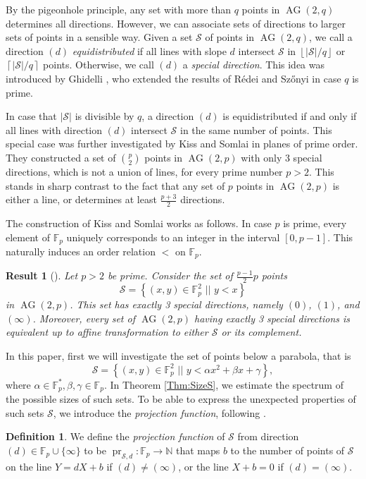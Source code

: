 \documentclass[a4paper, 12pt]{article}
\newtheorem{res}[thm]{Result}
\theoremstyle{definition}
\newtheorem{df}[thm]{Definition}
\newcommand{\FF}{\mathbb F}
\newcommand{\NN}{\mathbb N}
\newcommand{\sett}[2]{ \left\{ #1 \, \, || \, \, #2 \right \} }
\newcommand{\floor}[1]{\left \lfloor #1 \right \rfloor}
\newcommand{\ceil}[1]{\left \lceil #1 \right \rceil}
\newcommand{\ms}{\mathcal S}
\DeclareMathOperator{\AG}{AG}
\newcommand{\ag}{\AG}
\DeclareMathOperator{\pr}{pr}
\newcommand{\fpi}{\FF_p \cup \{\infty\}}
\begin{document}
By the pigeonhole principle, any set with more than $q$ points in $\ag(2,q)$ determines all directions.
However, we can associate sets of directions to larger sets of points in a sensible way.
Given a set $\ms$ of points in $\ag(2,q)$, we call a direction $(d)$ \emph{equidistributed} if all lines with slope $d$ intersect $\ms$ in $\floor{|\ms|/q}$ or $\ceil{|\ms|/q}$ points.
Otherwise, we call $(d)$ a \emph{special direction}.
This idea was introduced by Ghidelli \cite{Ghidelli:20}, who extended the results of Rédei \cite{Redei:70} and Sz\H onyi \cite{Szonyi:96} in case $q$ is prime.

In case that $|\ms|$ is divisible by $q$, a direction $(d)$ is equidistributed if and only if all lines with direction $(d)$ intersect $\ms$ in the same number of points.
This special case was further investigated by Kiss and Somlai \cite{KS} in planes of prime order.
They constructed a set of $\binom p2$ points in $\ag(2,p)$ with only 3 special directions, which is not a union of lines, for every prime number $p > 2$.
This stands in sharp contrast to the fact that any set of $p$ points in $\ag(2,p)$ is either a line, or determines at least $\frac{p+3}2$ directions.

The construction of Kiss and Somlai \cite{KS} works as follows.
In case $p$ is prime, every element of $\FF_p$ uniquely corresponds to an integer in the interval $[0, p-1]$.
This naturally induces an order relation $<$ on $\FF_p$.

\begin{res}[{\cite[Theorem 1.1]{KS}}]
 \label{Res:KissSomlai}
 Let $p > 2$ be prime.
 Consider the set of $\frac{p-1}2 p$ points
 \[
  \ms = \sett{ (x,y) \in \FF_p^2 }{ y < x }
 \]
 in $\ag(2,p)$.
 This set has exactly 3 special directions, namely $(0)$, $(1)$, and $(\infty)$.
 Moreover, every set of $\ag(2,p)$ having exactly 3 special directions is equivalent up to affine transformation to either $\ms$ or its complement.
\end{res}

In this paper, first we will investigate the set of points below a parabola, that is 
\[
{\mathcal{S}} = \sett{(x,y) \in \FF_p^2}{ y < \alpha x^2 + \beta x + \gamma},
\]
where $\alpha \in \FF_p^*, \beta, \gamma \in \FF_p$.
In Theorem \ref{Thm:SizeS}, we estimate the spectrum of the possible sizes of such sets.
To be able to express the unexpected properties of such sets $\ms$, we introduce the \emph{projection function}, following \cite{KS}.

\begin{df}
We define the \emph{projection function} of $\ms$ from direction $(d) \in \fpi$ to be $\pr_{\ms,d}:\FF_p \to \NN$ that maps $b$ to the number of points of $\ms$ on the line $Y=dX+b$ if $(d) \neq (\infty)$, or the line $X+b=0$ if $(d) = (\infty)$.
\end{df}
\end{document}
